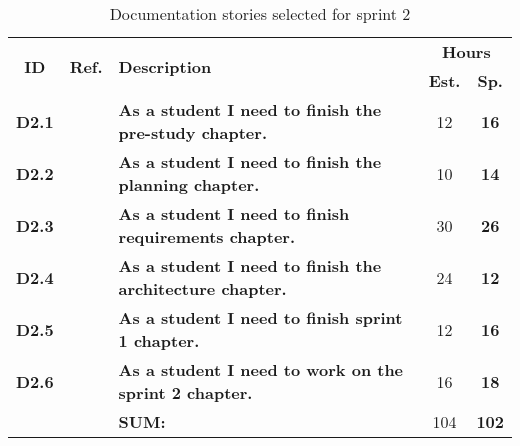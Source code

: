 \def\arraystretch{1.25}
 
\begin{longtable}{ccXcc}
\label{tab:sprint2Documentationstories}\\[-6mm]
\caption{Documentation stories selected for sprint 2}\\[-4mm]
\toprule[0.5mm]
\multirow{2}{*}{\textbf{ID}} &
\multirow{2}{*}{\textbf{Ref.}} & \multirow{2}{*}{\textbf{Description}} & \multicolumn{2}{c}{\textbf{Hours}} \\
 					& & & \textbf{Est.} & \textbf{Sp.} \\
\midrule


\textbf{D2.1} 	& 	& {\bf As a student I need to finish the pre-study chapter.} 									& 	12	& \textbf{ 16} \\

\textbf{D2.2} 	& 	& {\bf As a student I need to finish the planning chapter.} 									& 	10	& \textbf{ 14} \\

\textbf{D2.3} 	& 	& {\bf As a student I need to finish requirements chapter.} 									& 	30	& \textbf{ 26} \\

\textbf{D2.4} 	&   & {\bf As a student I need to finish the architecture chapter.} 								& 	24	& \textbf{ 12} \\

\textbf{D2.5} 	& 	& {\bf As a student I need to finish sprint 1 chapter.} 										& 	12	& \textbf{ 16} \\

\textbf{D2.6} 	& 	& {\bf As a student I need to work on the  sprint 2 chapter.} 									& 	16	& \textbf{ 18} \\

								
\hline
				&& \textbf{SUM:}		&		104	& \textbf{102}
 \\																			
\bottomrule[0.5mm]
\end{longtable}
